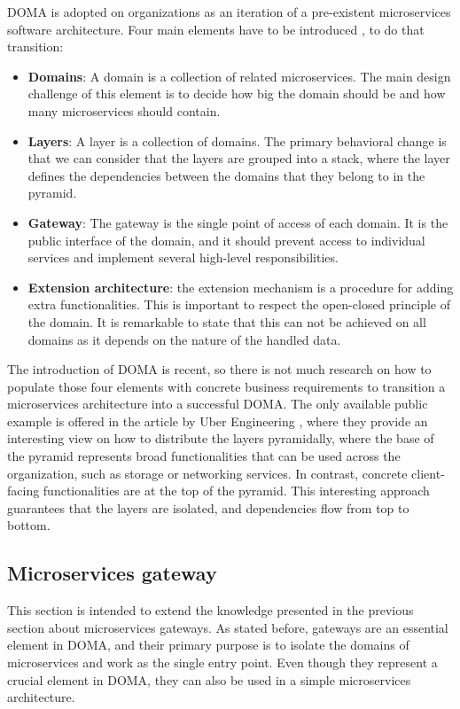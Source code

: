 \documentclass[english, 12pt, a4paper, sci, utf8, a-1b, online]{aaltothesis}
\begin{document}
DOMA is adopted on organizations as an iteration of a pre-existent microservices software architecture. Four main elements have to be introduced \cite{DOMAUber}, to do that transition:

\begin{itemize}
    \item \textbf{Domains}: A domain is a collection of related microservices. The main design challenge of this element is to decide how big the domain should be and how many microservices should contain.
    \item \textbf{Layers}: A layer is a collection of domains. The primary behavioral change is that we can consider that the layers are grouped into a stack, where the layer defines the dependencies between the domains that they belong to in the pyramid.
    \item \textbf{Gateway}: The gateway is the single point of access of each domain. It is the public interface of the domain, and it should prevent access to individual services and implement several high-level responsibilities.
    \item \textbf{Extension architecture}: the extension mechanism is a procedure for adding extra functionalities. This is important to respect the open-closed principle of the domain. It is remarkable to state that this can not be achieved on all domains as it depends on the nature of the handled data.
\end{itemize}

The introduction of DOMA is recent, so there is not much research on how to populate those four elements with concrete business requirements to transition a microservices architecture into a successful DOMA. The only available public example is offered in the article by Uber Engineering \cite{DOMAUber}, where they provide an interesting view on how to distribute the layers pyramidally, where the base of the pyramid represents broad functionalities that can be used across the organization, such as storage or networking services. In contrast, concrete client-facing functionalities are at the top of the pyramid. This interesting approach guarantees that the layers are isolated, and dependencies flow from top to bottom.

\subsection{Microservices gateway}
\label{sec:microservices-gateway}

This section is intended to extend the knowledge presented in the previous section about microservices gateways. As stated before, gateways are an essential element in DOMA, and their primary purpose is to isolate the domains of microservices and work as the single entry point. Even though they represent a crucial element in DOMA, they can also be used in a simple microservices architecture.\\
\end{document}
